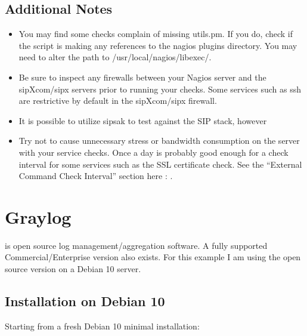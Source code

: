 \documentclass[letterpaper,10pt,english]{sphinxmanual}
\begin{document}
\subsection{Additional Notes}
\label{\detokenize{monitoring:additional-notes}}\begin{itemize}
\item {} 
You may find some checks complain of missing utils.pm. If you do, check if the script is making any references to the nagios plugins directory. You may need to alter the path to /usr/local/nagios/libexec/.

\item {} 
Be sure to inspect any firewalls between your Nagios server and the sipXcom/sipx servers prior to running your checks. Some services such as ssh are restrictive by default in the sipXcom/sipx firewall.

\item {} 
It is possible to utilize sipsak to test against the SIP stack, however 

\item {} 
Try not to cause unnecessary stress or bandwidth consumption on the server with your service checks. Once a day is probably good enough for a check interval for some services such as the SSL certificate check. See the “External Command Check Interval” section here : .

\end{itemize}


\section{Graylog}
\label{\detokenize{monitoring:id2}}
 is open source log management/aggregation software. A fully supported Commercial/Enterprise version also exists. For this example I am using the open source version on a Debian 10 server.


\subsection{Installation on Debian 10}
\label{\detokenize{monitoring:installation-on-debian-10}}
Starting from a fresh Debian 10 minimal installation:
\end{document}
